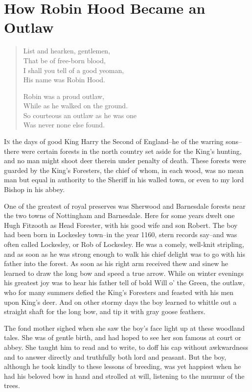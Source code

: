 \chapter{How Robin Hood Became an Outlaw}

\begin{quote}
List and hearken, gentlemen,\\
That be of free-born blood,\\
I shall you tell of a good yeoman,\\
His name was Robin Hood.

Robin was a proud outlaw,\\
While as he walked on the ground.\\
So courteous an outlaw as he was one\\
Was never none else found.
\end{quote}

\lettrine{I}{n} the days of good King Harry the Second of England--he of the warring
sons--there were certain forests in the north country set aside for the
King's hunting, and no man might shoot deer therein under penalty of
death. These forests were guarded by the King's Foresters, the chief of
whom, in each wood, was no mean man but equal in authority to the
Sheriff in his walled town, or even to my lord Bishop in his abbey.

One of the greatest of royal preserves was Sherwood and Barnesdale
forests near the two towns of Nottingham and Barnesdale. Here for some
years dwelt one Hugh Fitzooth as Head Forester, with his good wife and
son Robert. The boy had been born in Lockesley town--in the year 1160,
stern records say--and was often called Lockesley, or Rob of Lockesley.
He was a comely, well-knit stripling, and as soon as he was strong
enough to walk his chief delight was to go with his father into the
forest. As soon as his right arm received thew and sinew he learned to
draw the long bow and speed a true arrow. While on winter evenings his
greatest joy was to hear his father tell of bold Will o' the Green, the
outlaw, who for many summers defied the King's Foresters and feasted
with his men upon King's deer. And on other stormy days the boy learned
to whittle out a straight shaft for the long bow, and tip it with gray
goose feathers.

The fond mother sighed when she saw the boy's face light up at these
woodland tales. She was of gentle birth, and had hoped to see her son
famous at court or abbey. She taught him to read and to write, to doff
his cap without awkwardness and to answer directly and truthfully both
lord and peasant. But the boy, although he took kindly to these lessons
of breeding, was yet happiest when he had his beloved bow in hand and
strolled at will, listening to the murmur of the trees.

